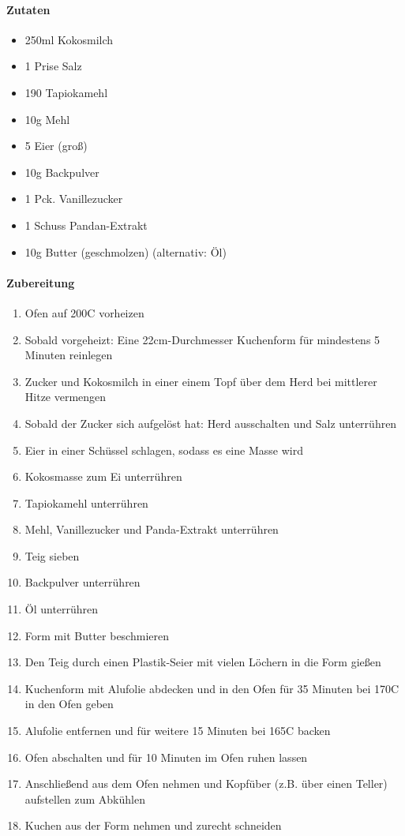 \clearpage
{}
\label{BanhBoNuong}

\paragraph{Zutaten}
\begin{itemize}[noitemsep]
	\itemm 160g Zucker
	\item 250ml Kokosmilch
	\item 1 Prise Salz
	\item 190 Tapiokamehl
	\item 10g Mehl
	\item 5 Eier (groß)
	\item 10g Backpulver
	\item 1 Pck. Vanillezucker 
	\item 1 Schuss Pandan-Extrakt
	\item 10g Butter (geschmolzen) (alternativ: Öl)
\end{itemize}

\paragraph{Zubereitung}
\begin{enumerate}[noitemsep]
	\item Ofen auf 200\textdegree C vorheizen 
	\item Sobald vorgeheizt: Eine 22cm-Durchmesser Kuchenform für mindestens 5 Minuten reinlegen
	\item Zucker und Kokosmilch in einer einem Topf über dem Herd bei mittlerer Hitze vermengen
	\item Sobald der Zucker sich aufgelöst hat: Herd ausschalten und Salz unterrühren
	\item Eier in einer Schüssel schlagen, sodass es eine Masse wird
	\item Kokosmasse zum Ei unterrühren
	\item Tapiokamehl unterrühren
	\item Mehl, Vanillezucker und Panda-Extrakt unterrühren
	\item Teig sieben
	\item Backpulver unterrühren
	\item Öl unterrühren
	\item Form mit Butter beschmieren
	\item Den Teig durch einen Plastik-Seier mit vielen Löchern in die Form gießen
	\item Kuchenform mit Alufolie abdecken und in den Ofen für 35 Minuten bei 170\textdegree C in den Ofen geben
	\item Alufolie entfernen und für weitere 15 Minuten bei 165\textdegree C backen
	\item Ofen abschalten und für 10 Minuten im Ofen ruhen lassen
	\item Anschließend aus dem Ofen nehmen und Kopfüber (z.B. über einen Teller) aufstellen zum Abkühlen
	\item Kuchen aus der Form nehmen und zurecht schneiden
\end{enumerate}